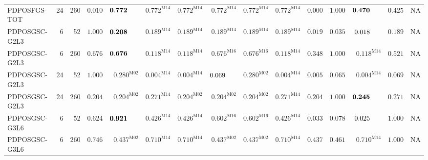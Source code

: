 \documentclass[10pt,a4paper]{article}
\begin{document}
\begin{longtable}{@{}lrrrrrrrrrrrrrr@{}}
PDPOSFGS-TOT & 24 & 260 & $0.010$ & $\mathbf{0.772}\hphantom{^{\mathrm{M00}}}$ & $\mathbf{0.772}^{\mathrm{M14}}$ & $\mathbf{0.772}^{\mathrm{M14}}$ & $\mathbf{0.772}^{\mathrm{M14}}$ & $\mathbf{0.772}^{\mathrm{M14}}$ & $\mathbf{0.772}^{\mathrm{M14}}$ & $0.000$ & $\mathbf{1.000}$ & $\mathbf{0.470}\hphantom{^{\mathrm{M00}}}$ & $\mathbf{0.425}$ & \textsc{NA} \\
PDPOSGSC-G2L3 & 6 & 52 & $\mathbf{1.000}$ & $\mathbf{0.208}\hphantom{^{\mathrm{M00}}}$ & $\mathbf{0.189}^{\mathrm{M14}}$ & $\mathbf{0.189}^{\mathrm{M14}}$ & $\mathbf{0.189}^{\mathrm{M14}}$ & $\mathbf{0.189}^{\mathrm{M14}}$ & $\mathbf{0.189}^{\mathrm{M14}}$ & $0.019$ & $0.035$ & $0.018\hphantom{^{\mathrm{M00}}}$ & $\mathbf{0.189}$ & \textsc{NA} \\
PDPOSGSC-G2L3 & 6 & 260 & $\mathbf{0.676}$ & $\mathbf{0.676}\hphantom{^{\mathrm{M00}}}$ & $\mathbf{0.118}^{\mathrm{M14}}$ & $\mathbf{0.118}^{\mathrm{M14}}$ & $\mathbf{0.676}^{\mathrm{M16}}$ & $\mathbf{0.676}^{\mathrm{M16}}$ & $\mathbf{0.118}^{\mathrm{M14}}$ & $\mathbf{0.348}$ & $\mathbf{1.000}$ & $\mathbf{0.118}^{\mathrm{M14}}$ & $\mathbf{0.521}$ & \textsc{NA} \\
PDPOSGSC-G2L3 & 24 & 52 & $\mathbf{1.000}$ & $\mathbf{0.280}^{\mathrm{M02}}$ & $0.004^{\mathrm{M14}}$ & $0.004^{\mathrm{M14}}$ & $0.069\hphantom{^{\mathrm{M00}}}$ & $\mathbf{0.280}^{\mathrm{M02}}$ & $0.004^{\mathrm{M14}}$ & $0.005$ & $0.065$ & $0.004^{\mathrm{M14}}$ & $0.069$ & \textsc{NA} \\
PDPOSGSC-G2L3 & 24 & 260 & $\mathbf{0.204}$ & $\mathbf{0.204}^{\mathrm{M02}}$ & $\mathbf{0.271}^{\mathrm{M14}}$ & $\mathbf{0.204}^{\mathrm{M02}}$ & $\mathbf{0.204}^{\mathrm{M02}}$ & $\mathbf{0.204}^{\mathrm{M02}}$ & $\mathbf{0.271}^{\mathrm{M14}}$ & $\mathbf{0.204}$ & $\mathbf{1.000}$ & $\mathbf{0.245}\hphantom{^{\mathrm{M00}}}$ & $\mathbf{0.271}$ & \textsc{NA} \\
PDPOSGSC-G3L6 & 6 & 52 & $\mathbf{0.624}$ & $\mathbf{0.921}\hphantom{^{\mathrm{M00}}}$ & $\mathbf{0.426}^{\mathrm{M14}}$ & $\mathbf{0.426}^{\mathrm{M14}}$ & $\mathbf{0.602}^{\mathrm{M16}}$ & $\mathbf{0.602}^{\mathrm{M16}}$ & $\mathbf{0.426}^{\mathrm{M14}}$ & $0.033$ & $0.078$ & $0.025\hphantom{^{\mathrm{M00}}}$ & $\mathbf{1.000}$ & \textsc{NA} \\
PDPOSGSC-G3L6 & 6 & 260 & $\mathbf{0.746}$ & $\mathbf{0.437}^{\mathrm{M02}}$ & $\mathbf{0.710}^{\mathrm{M14}}$ & $\mathbf{0.710}^{\mathrm{M14}}$ & $\mathbf{0.437}^{\mathrm{M02}}$ & $\mathbf{0.437}^{\mathrm{M02}}$ & $\mathbf{0.710}^{\mathrm{M14}}$ & $\mathbf{0.437}$ & $\mathbf{0.461}$ & $\mathbf{0.710}^{\mathrm{M14}}$ & $\mathbf{1.000}$ & \textsc{NA} \\

\end{longtable}
\end{document}
